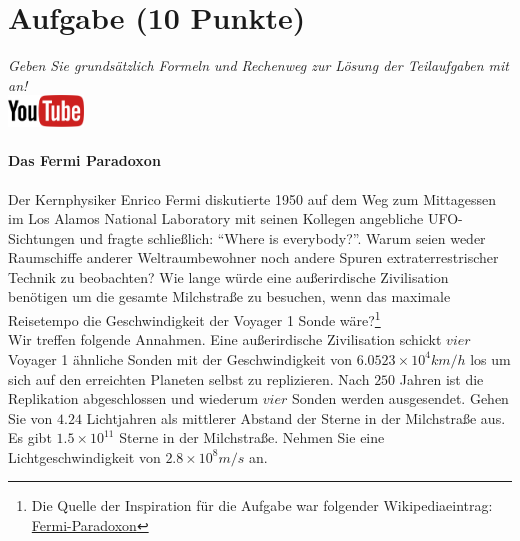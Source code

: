 \documentclass[a4paper, 9pt]{scrartcl}\usepackage[]{graphicx}\usepackage[]{xcolor}
\begin{document}
 
\clearpage

\section{Aufgabe \hfill (10 Punkte)}

\textit{Geben Sie grunds{\"a}tzlich Formeln und Rechenweg zur L{\"o}sung der
  Teilaufgaben mit an!} \\[1Ex]

\hfill\href{https://youtu.be/iCQogS6KhPM}{\includegraphics[width =
  2cm]{img/youtube}} %
\hspace{2Ex}

\paragraph{Das Fermi Paradoxon}



Der Kernphysiker Enrico Fermi diskutierte 1950 auf dem Weg zum Mittagessen
im Los Alamos National Laboratory mit seinen Kollegen angebliche
UFO-Sichtungen und fragte schlie{\ss}lich: "`Where is everybody?"'. Warum seien
weder Raumschiffe anderer Weltraumbewohner noch andere Spuren
extraterrestrischer Technik zu beobachten? Wie lange w{\"u}rde eine au{\ss}erirdische
Zivilisation ben{\"o}tigen um die gesamte Milchstra{\ss}e zu
besuchen, wenn das maximale Reisetempo die Geschwindigkeit der Voyager 1 Sonde w{\"a}re?\footnote{Die Quelle der Inspiration
  für die Aufgabe war folgender Wikipediaeintrag:
  \href{https://de.wikipedia.org/wiki/Fermi-Paradoxon}{Fermi-Paradoxon}}\\[-1ex]

Wir treffen folgende Annahmen. Eine au{\ss}erirdische Zivilisation schickt $vier$
Voyager 1 {\"a}hnliche Sonden mit der Geschwindigkeit von $\ensuremath{6.0523\times 10^{4}}km/h$
los um sich auf den erreichten Planeten selbst zu replizieren. Nach
$250$ Jahren ist die Replikation abgeschlossen und wiederum
$vier$ Sonden werden ausgesendet. Gehen Sie von
$4.24$ Lichtjahren als mittlerer Abstand der Sterne in der
Milchstra{\ss}e aus. Es gibt $\ensuremath{1.5\times 10^{11}}$ Sterne in der Milchstra{\ss}e. Nehmen
Sie eine Lichtgeschwindigkeit von $\ensuremath{2.8\times 10^{8}}m/s$ an.
\end{document}

